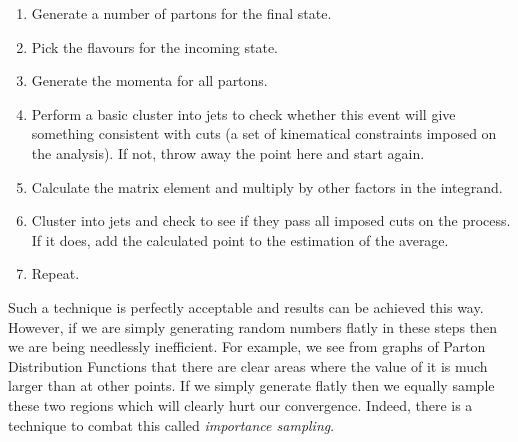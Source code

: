 \begin{enumerate} 
\item{Generate a number of partons for the final state.}
\item{Pick the flavours for the incoming state.}
\item{Generate the momenta for all partons.}
\item{Perform a basic cluster into jets to check whether this event will give something consistent with cuts (a set of kinematical constraints imposed on the analysis). If not, throw away the point here and start again.}
\item{Calculate the matrix element and multiply by other factors in the integrand.}
\item{Cluster into jets and check to see if they pass all imposed cuts on the process. If it does, add the calculated point to the estimation of the average.}
\item{Repeat.}

\end{enumerate}

Such a technique is perfectly acceptable and results can be achieved this way. However, if we are simply generating random numbers flatly in these steps then we are being needlessly inefficient. For example, we see from graphs of Parton Distribution Functions that there are clear areas where the value of it is much larger than at other points. If we simply generate flatly then we equally sample these two regions which will clearly hurt our convergence. Indeed, there is a technique to combat this called \emph{importance sampling}. 

